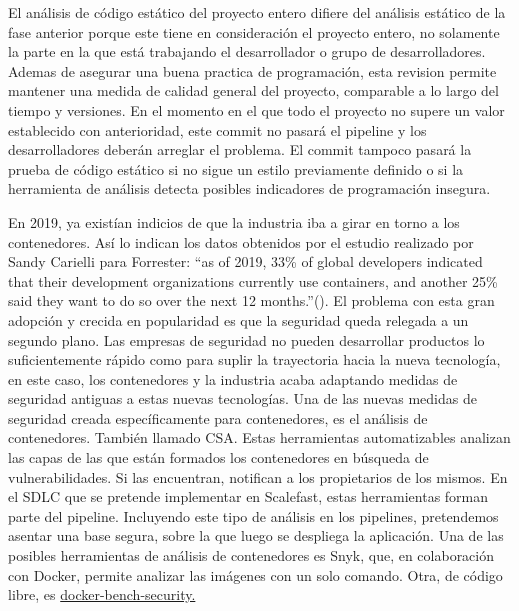 \documentclass[12pt]{report} %
\begin{document}
El análisis de código estático del proyecto entero difiere del análisis estático
de la fase anterior porque este tiene en consideración el proyecto entero, no
solamente la parte en la que está trabajando el desarrollador o grupo de
desarrolladores.  Ademas de asegurar una buena practica de programación, esta
revision permite mantener una medida de calidad general del proyecto, comparable
a lo largo del tiempo y versiones.  En el momento en el que todo el proyecto no
supere un valor establecido con anterioridad, este commit no pasará el
\gls{pipeline} y los desarrolladores deberán arreglar el problema.  El commit
tampoco pasará la prueba de código estático si no sigue un estilo previamente
definido o si la herramienta de análisis detecta posibles indicadores de
programación insegura.

En 2019, ya existían indicios de que la industria iba a girar en torno a los
contenedores.
Así lo indican los datos obtenidos por el estudio realizado por Sandy Carielli
para Forrester:
``as of 2019, 33\% of global developers indicated that their development
organizations currently use containers, and another 25\% said they want to do so
over the next 12 months.''(\cite{Carielli2020}).
El problema con esta gran adopción y crecida en popularidad es que la seguridad
queda relegada a un segundo plano.
Las empresas de seguridad no pueden desarrollar productos lo suficientemente
rápido como para suplir la trayectoria hacia la nueva tecnología, en este caso,
los contenedores y la industria acaba adaptando medidas de seguridad antiguas a
estas nuevas tecnologías.
Una de las nuevas medidas de seguridad creada específicamente para contenedores,
es el análisis de contenedores.
También llamado \gls{CSA}.
Estas herramientas automatizables analizan las capas de las que están formados los
contenedores en búsqueda de vulnerabilidades.
Si las encuentran, notifican a los propietarios de los mismos.
En el \gls{SDLC} que se pretende implementar en Scalefast, estas herramientas
forman parte del \gls{pipeline}.
Incluyendo este tipo de análisis en los \gls{pipeline}s, pretendemos asentar una
base segura, sobre la que luego se despliega la aplicación. 
Una de las posibles herramientas de análisis de contenedores es Snyk, que, en
colaboración con Docker, permite analizar las imágenes con un solo comando.
Otra, de código libre, es \href{https://github.com/docker/docker-bench-security}{docker-bench-security.}
\end{document}
